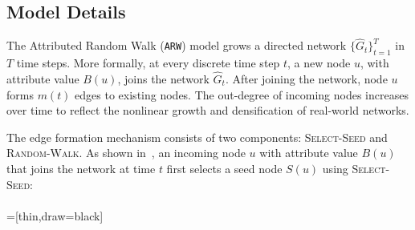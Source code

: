 
\subsection{Model Details}
\label{sub:Model Description}


The Attributed Random Walk (\texttt{ARW}) model grows a directed network $\{\hat{G}_t\}^T_{t=1}$
in $T$ time steps.
More formally, at every discrete time step $t$, a
new node $u$, with attribute value $B(u)$, joins the network $\hat{G}_t$.
After joining the network, node $u$ forms $m(t)$ edges to
existing nodes.
The out-degree of incoming nodes increases over time to
reflect the nonlinear growth and densification of real-world networks.

The edge formation mechanism consists of two components: \textsc{Select-Seed} and
\textsc{Random-Walk}. As shown in~, an incoming node $u$ with attribute value $B(u)$ that joins the
network at time $t$ first selects a seed node $S(u)$ using \textsc{Select-Seed}:
\\\\
=[thin,draw=black]


